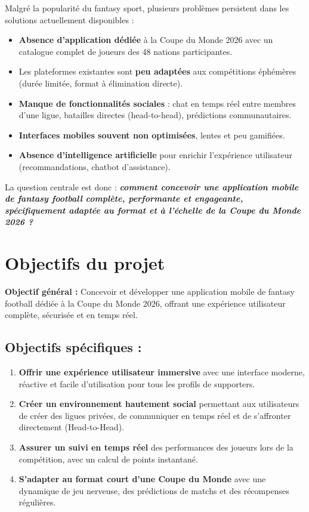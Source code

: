 Malgré la popularité du fantasy sport, plusieurs problèmes persistent dans les solutions actuellement disponibles :

\begin{itemize}
    \item \textbf{Absence d'application dédiée} à la Coupe du Monde 2026 avec un catalogue complet de joueurs des 48 nations participantes.
    \item Les plateformes existantes sont \textbf{peu adaptées} aux compétitions éphémères (durée limitée, format à élimination directe).
    \item \textbf{Manque de fonctionnalités sociales} : chat en temps réel entre membres d'une ligue, batailles directes (head-to-head), prédictions communautaires.
    \item \textbf{Interfaces mobiles souvent non optimisées}, lentes et peu gamifiées.
    \item \textbf{Absence d'intelligence artificielle} pour enrichir l'expérience utilisateur (recommandations, chatbot d'assistance).
\end{itemize}

La question centrale est donc : \textbf{\textit{comment concevoir une application mobile de fantasy football complète, performante et engageante, spécifiquement adaptée au format et à l'échelle de la Coupe du Monde 2026 ?}}

\section{Objectifs du projet}

\textbf{Objectif général :} Concevoir et développer une application mobile de fantasy football dédiée à la Coupe du Monde 2026, offrant une expérience utilisateur complète, sécurisée et en temps réel.

\subsection*{Objectifs spécifiques :}

\begin{enumerate}
    \item \textbf{Offrir une expérience utilisateur immersive} avec une interface moderne, réactive et facile d'utilisation pour tous les profils de supporters.
    \item \textbf{Créer un environnement hautement social} permettant aux utilisateurs de créer des ligues privées, de communiquer en temps réel et de s'affronter directement (Head-to-Head).
    \item \textbf{Assurer un suivi en temps réel} des performances des joueurs lors de la compétition, avec un calcul de points instantané.
    \item \textbf{S'adapter au format court d'une Coupe du Monde} avec une dynamique de jeu nerveuse, des prédictions de matchs et des récompenses régulières.
\end{enumerate}

